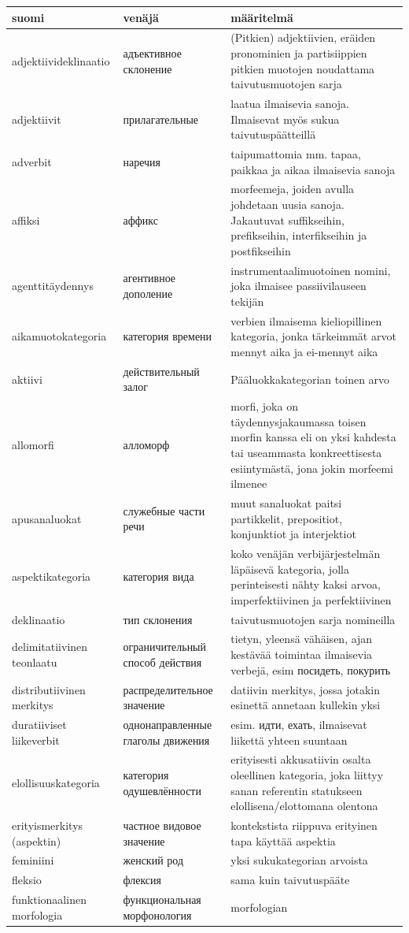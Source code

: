 \documentclass[]{scrreprt}
\begin{document}
\begin{longtable}[c]{p{4cm}p{4cm}p{7cm}}
\toprule
suomi & venäjä & määritelmä\tabularnewline
\midrule
\endhead
adjektiivideklinaatio & адъективное склонение & (Pitkien) adjektiivien,
eräiden pronominien ja partisiippien pitkien muotojen noudattama
taivutusmuotojen sarja\tabularnewline
adjektiivit & прилагательные & laatua ilmaisevia sanoja. Ilmaisevat myös
sukua taivutuspäätteillä\tabularnewline
adverbit & наречия & taipumattomia mm. tapaa, paikkaa ja aikaa
ilmaisevia sanoja\tabularnewline
affiksi & аффикс & morfeemeja, joiden avulla johdetaan uusia sanoja.
Jakautuvat suffikseihin, prefikseihin, interfikseihin ja
postfikseihin\tabularnewline
agenttitäydennys & агентивное дополение & instrumentaalimuotoinen
nomini, joka ilmaisee passiivilauseen tekijän\tabularnewline
aikamuotokategoria & категория времени & verbien ilmaisema
kieliopillinen kategoria, jonka tärkeimmät arvot mennyt aika ja
ei-mennyt aika\tabularnewline
aktiivi & действительный залог & Pääluokkakategorian toinen
arvo\tabularnewline
allomorfi & алломорф & morfi, joka on täydennysjakaumassa toisen morfin
kanssa eli on yksi kahdesta tai useammasta konkreettisesta esiintymästä,
jona jokin morfeemi ilmenee\tabularnewline
apusanaluokat & служебные части речи & muut sanaluokat paitsi
partikkelit, prepositiot, konjunktiot ja interjektiot\tabularnewline
aspektikategoria & категория вида & koko venäjän verbijärjestelmän
läpäisevä kategoria, jolla perinteisesti nähty kaksi arvoa,
imperfektiivinen ja perfektiivinen\tabularnewline
deklinaatio & тип склонения & taivutusmuotojen sarja
nomineilla\tabularnewline
delimitatiivinen teonlaatu & ограничительный способ действия & tietyn,
yleensä vähäisen, ajan kestävää toimintaa ilmaisevia verbejä, esim
посидеть, покурить\tabularnewline
distributiivinen merkitys & распределительное значение & datiivin
merkitys, jossa jotakin esinettä annetaan kullekin yksi\tabularnewline
duratiiviset liikeverbit & однонаправленные глаголы движения & esim.
идти, ехать, ilmaisevat liikettä yhteen suuntaan\tabularnewline
elollisuuskategoria & категория одушевлённости & erityisesti
akkusatiivin osalta oleellinen kategoria, joka liittyy sanan referentin
statukseen elollisena/elottomana olentona\tabularnewline
erityismerkitys (aspektin) & частное видовое значение & kontekstista
riippuva erityinen tapa käyttää aspektia\tabularnewline
feminiini & женский род & yksi sukukategorian arvoista\tabularnewline
fleksio & флексия & sama kuin taivutuspääte\tabularnewline
funktionaalinen morfologia & функциональная морфонология & morfologian

\end{longtable}
\end{document}
